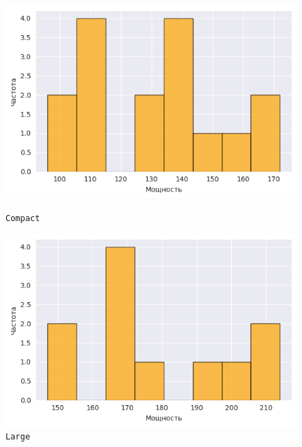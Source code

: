 \documentclass[a4paper,12pt]{article}
\begin{document}
\begin{figure}[H]
    \begin{minipage}{0.45\textwidth}
        \centering
        \includegraphics[width=\textwidth]{images/hist_compact.png}
        \caption{\texttt{Compact}}
    \end{minipage}
    \quad
    \begin{minipage}{0.45\textwidth}
        \centering
        \includegraphics[width=\textwidth]{images/hist_large.png}
        \caption{\texttt{Large}}
    \end{minipage}


\end{figure}
\end{document}
